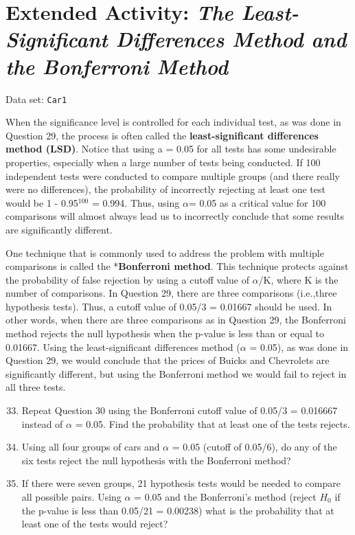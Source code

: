 \documentclass[
]{report}
\theoremstyle{definition}
\theoremstyle{definition}
\theoremstyle{definition}
\theoremstyle{definition}
\theoremstyle{remark}
\begin{document}
\hypertarget{extended-activity-the-least-significant-differences-method-and-the-bonferroni-method}{%
\section*{\texorpdfstring{Extended Activity: \emph{The Least-Significant Differences Method and the Bonferroni Method}}{Extended Activity: The Least-Significant Differences Method and the Bonferroni Method}}\label{extended-activity-the-least-significant-differences-method-and-the-bonferroni-method}}

Data set: \texttt{Car1}

When the significance level is controlled for each individual test, as was done in Question 29, the process is often called the \textbf{least-significant differences method (LSD)}. Notice that using a = 0.05 for all tests has some undesirable properties, especially when a large number of tests being conducted. If 100 independent tests were conducted to compare multiple groups (and there really were no differences), the probability of incorrectly rejecting at least one test would be 1 - 0.95\(^{100}\) = 0.994. Thus, using \(\alpha\)= 0.05 as a critical value for 100 comparisons will almost always lead us to incorrectly conclude that some results are significantly different.

One technique that is commonly used to address the problem with multiple comparisons is called the *\textbf{Bonferroni method}. This technique protects against the probability of false rejection by using a cutoff value of \(\alpha\)/K, where K is the number of comparisons. In Question 29, there are three comparisons (i.e.,three hypothesis tests). Thus, a cutoff value of 0.05/3 = 0.01667 should be used. In other words, when there are three comparisons as in Question 29, the Bonferroni method rejects the null hypothesis when the p-value is less than or equal to 0.01667. Using the least-significant differences method (\(\alpha\) = 0.05), as was done in Question 29, we would conclude that the prices of Buicks and Chevrolets are significantly different, but using the Bonferroni method we would fail to reject in all three tests.

\begin{enumerate}
  \setcounter{enumi}{32}
  \item Repeat Question 30 using the Bonferroni cutoff value of 0.05/3 = 0.016667 instead of $\alpha$ = 0.05. Find the probability that at least one of the tests rejects.
  \item Using all four groups of cars and $\alpha$ = 0.05 (cutoff of 0.05/6), do any of the six tests reject the null hypothesis with the Bonferroni method?
  \item If there were seven groups, 21 hypothesis tests would be needed to compare all possible pairs. Using $\alpha$ = 0.05 and the Bonferroni’s method (reject $H_0$ if the p-value is less than 0.05/21 = 0.00238) what is the probability that at least one of the tests would reject?
\end{enumerate}
\end{document}

